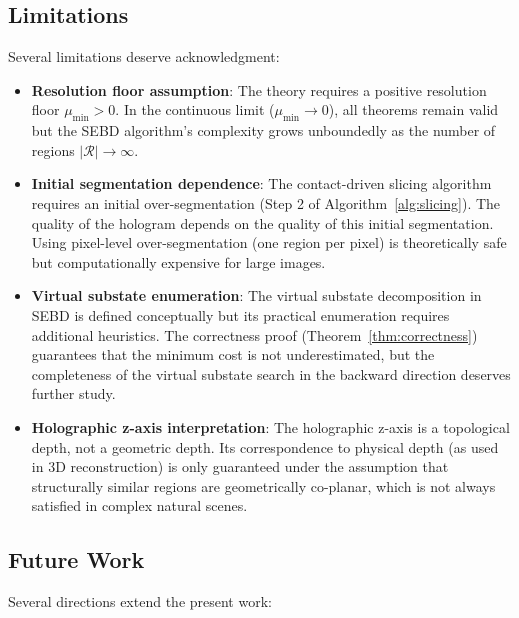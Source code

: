 \documentclass[twocolumn]{article}
\theoremstyle{plain}
\theoremstyle{definition}
\newcommand{\mumin}{\mu_{\min}}
\begin{document}
\subsection{Limitations}

Several limitations deserve acknowledgment:

\begin{itemize}
\item \textbf{Resolution floor assumption}: The theory requires a positive
  resolution floor $\mumin > 0$. In the continuous limit ($\mumin \to 0$),
  all theorems remain valid but the SEBD algorithm's complexity grows unboundedly
  as the number of regions $|\mathcal{R}| \to \infty$.

\item \textbf{Initial segmentation dependence}: The contact-driven slicing
  algorithm requires an initial over-segmentation (Step 2 of
  Algorithm~\ref{alg:slicing}). The quality of the hologram depends on the
  quality of this initial segmentation. Using pixel-level over-segmentation
  (one region per pixel) is theoretically safe but computationally expensive for
  large images.

\item \textbf{Virtual substate enumeration}: The virtual substate decomposition
  in SEBD is defined conceptually but its practical enumeration requires
  additional heuristics. The correctness proof (Theorem~\ref{thm:correctness})
  guarantees that the minimum cost is not underestimated, but the completeness
  of the virtual substate search in the backward direction deserves further study.

\item \textbf{Holographic z-axis interpretation}: The holographic z-axis is a
  topological depth, not a geometric depth. Its correspondence to physical depth
  (as used in 3D reconstruction) is only guaranteed under the assumption that
  structurally similar regions are geometrically co-planar, which is not always
  satisfied in complex natural scenes.
\end{itemize}

\subsection{Future Work}

Several directions extend the present work:
\end{document}
